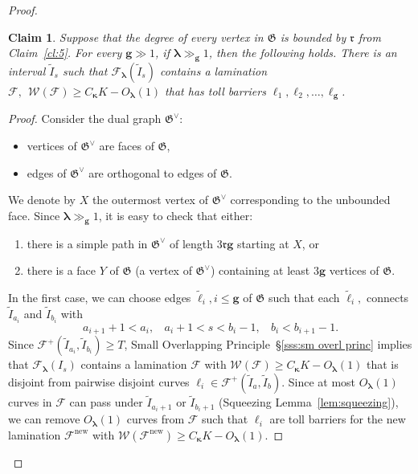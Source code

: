 \documentclass{amsart}
\renewcommand{\sp}{{\ \ }}
\newcommand{\1}{{\mathbb 1 }}
\newcommand{\blambda}{{\boldsymbol\lambda}}
\newcommand{\bkappa}{{\boldsymbol\kappa}}
\newcommand{\Fam}{{\mathcal F}}
\newcommand{\Width}{{\mathcal W}}
\newcommand{\bbg}{{\mathbf g}}
\newcommand{\rr}{\mathfrak{r}}
\newcommand\new{{\operatorname{new}}}
\newtheorem{claim}{Claim}
\theoremstyle{remark}
\numberwithin{equation}{section}
\theoremstyle{definition}
\begin{document}
\begin{proof}
\begin{claim}
\label{cl:6}
Suppose that the degree of every vertex in $\mathfrak G$ is bounded by $\rr$ from Claim~\ref{cl:5}.  For every $\bbg\gg 1$, if $\blambda\gg_\bbg 1$, then the following holds. There is an interval $\widetilde I_{s}$ such that $\Fam_\blambda(\widetilde I_s)$ contains a lamination $\Fam, \sp \Width(\Fam)\ge C_\bkappa K-O_\blambda(1)$ that has toll barriers $\ell_1, \ell_2, \dots, \ell_\bbg$.
\end{claim}
\begin{proof}
Consider the dual graph $\mathfrak G^\vee$:
\begin{itemize}
\item vertices of $\mathfrak G^\vee$ are faces of $\mathfrak G$,
\item edges of $\mathfrak G^\vee$ are orthogonal to edges of $\mathfrak G$.
\end{itemize}
We denote by $X$ the outermost vertex of  $\mathfrak G^\vee$ corresponding to the unbounded face. Since $\blambda\gg_\bbg 1$, it is easy to check that either:
\begin{enumerate}
\item there is a simple path in $\mathfrak G^\vee$ of length $3\rr \bbg$ starting at $X$, or
\item there is a face $Y$ of  $\mathfrak G$ (a vertex of $\mathfrak G^\vee$) containing at least $3\bbg$ vertices of $\mathfrak G$.  
\end{enumerate}

In the first case, we can choose edges $\tilde \ell_i, i\le \bbg$ of $\mathfrak G$ such that each $\tilde \ell_i,$ connects $\widetilde I_{a_i}$ and $\widetilde I_{b_i}$ with 
\begin{equation}
\label{eq:a_i b_i}
a_{i+1}+1<a_i ,\sp\sp  a_i+1 <s < b_i-1,\sp\sp b_i<b_{i+1}-1.
\end{equation}
 Since $\Fam^+(\widetilde I_{a_i}, \widetilde I_{b_i})\ge T$, Small Overlapping Principle~\S\ref{sss:sm overl princ} implies that $\Fam_\blambda(I_s)$ contains a lamination $\Fam$ with $\Width(\Fam)\ge C_\bkappa K-O_\blambda(1)$ that is disjoint from pairwise disjoint curves $\ell_i\in  \Fam^+(\widetilde I_a, \widetilde I_b)$. Since at most $O_\blambda(1)$ curves in $\Fam$ can pass under $\widetilde I_{a_{i}+1}$ or $\widetilde I_{b_{i}+1}$ (Squeezing Lemma~\ref{lem:squeezing}), we can remove $O_\blambda(1)$ curves from $\Fam$ such that $\ell_i$ are toll barriers for the new lamination $\Fam^\new$ with $\Width(\Fam^\new)\ge C_\bkappa K-O_\blambda(1)$.


\end{proof}
\end{proof}
\end{document}
